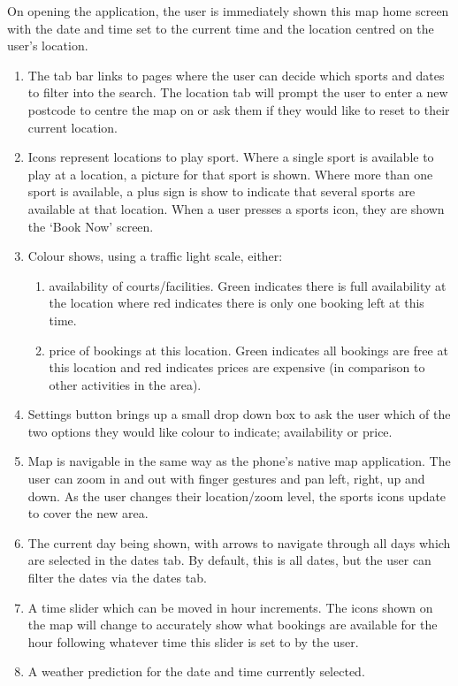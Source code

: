 On opening the application, the user is immediately shown this map home screen
with the date and time set to the current time and the location centred on the
user's location.
\begin{enumerate}
	\item The tab bar links to pages where the user can decide which sports and
		dates to filter into the search. The location tab will prompt the user
		to enter a new postcode to centre the map on or ask them if they would
		like to reset to their current location.
	\item Icons represent locations to play sport. Where a single sport is
		available to play at a location, a picture for that sport is shown.
		Where more than one sport is available, a plus sign is show to indicate
		that several sports are available at that location. When a user presses
		a sports icon, they are shown the `Book Now' screen.
	\item Colour shows, using a traffic light scale, either:
		\begin{enumerate}
			\item availability of courts/facilities. Green indicates there is
				full availability at the location where red indicates there is
				only one booking left at this time.
			\item price of bookings at this location. Green indicates all
				bookings are free at this location and red indicates prices are
				expensive (in comparison to other activities in the area).
		\end{enumerate}

	\item Settings button brings up a small drop down box to ask the user which
		of the two options they would like colour to indicate; availability or
		price.
	\item Map is navigable in the same way as the phone's native map
		application.  The user can zoom in and out with finger gestures and pan
		left, right, up and down. As the user changes their location/zoom
		level, the sports icons update to cover the new area.
	\item The current day being shown, with arrows to navigate through all days
		which are selected in the dates tab. By default, this is all dates, but
		the user can filter the dates via the dates tab.
	\item A time slider which can be moved in hour increments. The icons shown
		on the map will change to accurately show what bookings are available
		for the hour following whatever time this slider is set to by the user.
	\item A weather prediction for the date and time currently selected.
\end{enumerate}

